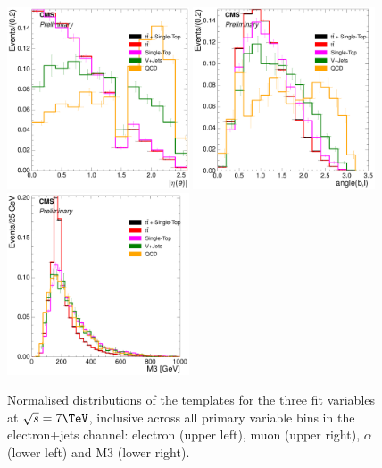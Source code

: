 \begin{figure}[hbtp]
    \centering
     \includegraphics[width=0.48\textwidth]{Chapters/04_Analysis/04b_XSections/images/7TeV/fit_variables/electron/MET/electron_absolute_eta/MET_inclusive_electron_absolute_eta_2orMoreBtags_templates.pdf}\hfill
     \includegraphics[width=0.48\textwidth]{Chapters/04_Analysis/04b_XSections/images/7TeV/fit_variables/electron/MET/angle_bl/MET_inclusive_angle_bl_2orMoreBtags_templates.pdf}\\
     \includegraphics[width=0.48\textwidth]{Chapters/04_Analysis/04b_XSections/images/7TeV/fit_variables/electron/MET/M3/MET_inclusive_M3_2orMoreBtags_templates.pdf}\\
	 \caption{Normalised distributions of the templates for the three fit variables at $\sqrt{s}=7\TeV$,
	 inclusive across all primary variable bins in the electron+jets channel: electron \abseta (upper left), muon
	 \abseta (upper right), $\alpha$ (lower left) and M3 (lower right).}
     \label{fig:fit_variable_distributions_electron_7TeV}
\end{figure}

